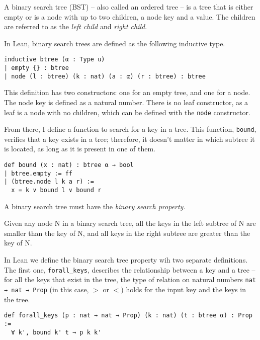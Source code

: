 A binary search tree (BST) -- also called an ordered tree -- is a tree that is either empty or is a node with up to two children, a node key and a value. The children are referred to as the \textit{left child} and \textit{right child}. 

In Lean, binary search trees are defined as the following inductive type.

\begin{lstlisting}
inductive btree (α : Type u)
| empty {} : btree
| node (l : btree) (k : nat) (a : α) (r : btree) : btree
\end{lstlisting}

This definition has two constructors: one for an empty tree, and one for a node. The node key is defined as a natural number. There is no leaf constructor, as a leaf is a node with no children, which can be defined with the \lstinline{node} constructor.

From there, I define a function to search for a key in a tree. This function, \lstinline{bound}, verifies that a key exists in a tree; therefore, it doesn't matter in which subtree it is located, as long as it is present in one of them.

\begin{lstlisting}
def bound (x : nat) : btree α → bool
| btree.empty := ff
| (btree.node l k a r) :=
  x = k ∨ bound l ∨ bound r
\end{lstlisting}

A binary search tree must have the \textit{binary search property}.

\begin{definition}
  \label{def:bst_property}
  Given any node N in a binary search tree, all the keys in the left subtree of N are smaller than the key of N, and all keys in the right subtree are greater than the 
  key of N.
\end{definition}

In Lean we define the binary search tree property wih two separate definitions. The first one, \lstinline{forall_keys}, describes the relationship between a key and a tree -- for all the keys that exist in the tree, the type of relation on natural numbers \lstinline{nat → nat → Prop} (in this case, $>$ or $<$) holds for the input key and the keys in the tree.

\begin{lstlisting}
def forall_keys (p : nat → nat → Prop) (k : nat) (t : btree α) : Prop :=
  ∀ k', bound k' t → p k k'
\end{lstlisting}

